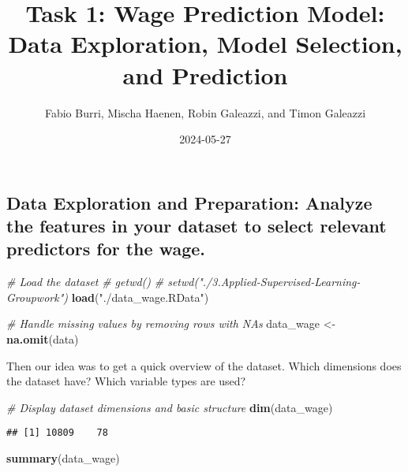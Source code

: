 \documentclass[
]{article}
\title{Task 1: Wage Prediction Model: Data Exploration, Model Selection,
and Prediction}
\author{Fabio Burri, Mischa Haenen, Robin Galeazzi, and Timon Galeazzi}
\date{2024-05-27}
\newenvironment{Shaded}{\begin{snugshade}}{\end{snugshade}}
\newcommand{\CommentTok}[1]{\textcolor[rgb]{0.56,0.35,0.01}{\textit{#1}}}
\newcommand{\FunctionTok}[1]{\textcolor[rgb]{0.13,0.29,0.53}{\textbf{#1}}}
\newcommand{\NormalTok}[1]{#1}
\newcommand{\OtherTok}[1]{\textcolor[rgb]{0.56,0.35,0.01}{#1}}
\newcommand{\StringTok}[1]{\textcolor[rgb]{0.31,0.60,0.02}{#1}}
\begin{document}
\maketitle

\subsection{Data Exploration and Preparation: Analyze the features in
your dataset to select relevant predictors for the
wage.}\label{data-exploration-and-preparation-analyze-the-features-in-your-dataset-to-select-relevant-predictors-for-the-wage.}

\begin{Shaded}
\begin{Highlighting}[]
\CommentTok{\# Load the dataset}
\CommentTok{\# getwd()}
\CommentTok{\# setwd("./3.Applied{-}Supervised{-}Learning{-}Groupwork")}
\FunctionTok{load}\NormalTok{(}\StringTok{"./data\_wage.RData"}\NormalTok{)}

\CommentTok{\# Handle missing values by removing rows with NAs}
\NormalTok{data\_wage }\OtherTok{\textless{}{-}} \FunctionTok{na.omit}\NormalTok{(data)}
\end{Highlighting}
\end{Shaded}

Then our idea was to get a quick overview of the dataset. Which
dimensions does the dataset have? Which variable types are used?

\begin{Shaded}
\begin{Highlighting}[]
\CommentTok{\# Display dataset dimensions and basic structure}
\FunctionTok{dim}\NormalTok{(data\_wage)}
\end{Highlighting}
\end{Shaded}

\begin{verbatim}
## [1] 10809    78
\end{verbatim}

\begin{Shaded}
\begin{Highlighting}[]
\FunctionTok{summary}\NormalTok{(data\_wage)}
\end{Highlighting}
\end{Shaded}
\end{document}
